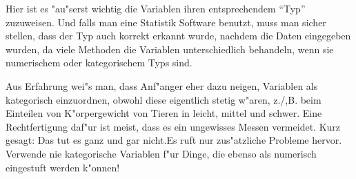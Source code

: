 \documentclass[a4paper,twoside]{tufte-book}\usepackage[]{graphicx}\usepackage[]{color}
\begin{document}
	Hier ist es "au"serst wichtig die Variablen ihren entsprechendem ``Typ'' zuzuweisen. Und falls man eine Statistik Software benutzt, muss man sicher stellen, dass der Typ auch korrekt erkannt wurde, nachdem die Daten eingegeben wurden, da viele Methoden die Variablen unterschiedlich behandeln, wenn sie numerischem oder kategorischem Typs sind.
	
	Aus Erfahrung wei"s man, dass Anf"anger eher dazu neigen, Variablen als kategorisch einzuordnen, obwohl diese eigentlich stetig w"aren, z./,B. beim Einteilen von K"orpergewicht von Tieren in leicht, mittel und schwer. Eine Rechtfertigung daf"ur ist meist, dass es ein ungewisses Messen vermeidet. Kurz gesagt: Das tut es ganz und gar nicht.Es ruft nur zus"atzliche Probleme hervor. Verwende nie kategorische Variablen f"ur Dinge, die ebenso als numerisch eingestuft werden k"onnen!
	
\end{document}
